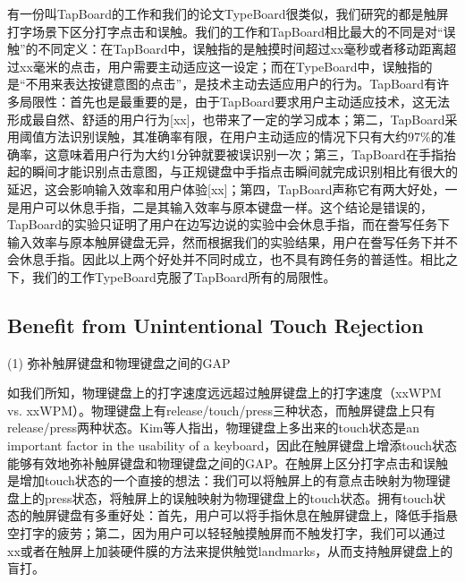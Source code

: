 有一份叫TapBoard的工作和我们的论文TypeBoard很类似\cite{2013-TapBoard}，我们研究的都是触屏打字场景下区分打字点击和误触。我们的工作和TapBoard相比最大的不同是对“误触”的不同定义：在TapBoard中，误触指的是触摸时间超过xx毫秒或者移动距离超过xx毫米的点击，用户需要主动适应这一设定；而在TypeBoard中，误触指的是“不用来表达按键意图的点击”，是技术主动去适应用户的行为。TapBoard有许多局限性：首先也是最重要的是，由于TapBoard要求用户主动适应技术，这无法形成最自然、舒适的用户行为[xx]，也带来了一定的学习成本；第二，TapBoard采用阈值方法识别误触，其准确率有限，在用户主动适应的情况下只有大约97\%的准确率，这意味着用户行为大约1分钟就要被误识别一次；第三，TapBoard在手指抬起的瞬间才能识别点击意图，与正规键盘中手指点击瞬间就完成识别相比有很大的延迟，这会影响输入效率和用户体验[xx]；第四，TapBoard声称它有两大好处，一是用户可以休息手指，二是其输入效率与原本键盘一样。这个结论是错误的，TapBoard的实验只证明了用户在边写边说的实验中会休息手指，而在誊写任务下输入效率与原本触屏键盘无异，然而根据我们的实验结果，用户在誊写任务下并不会休息手指。因此以上两个好处并不同时成立，也不具有跨任务的普适性。相比之下，我们的工作TypeBoard克服了TapBoard所有的局限性。


\subsection{Benefit from Unintentional Touch Rejection}

(1) 弥补触屏键盘和物理键盘之间的GAP

如我们所知，物理键盘上的打字速度远远超过触屏键盘上的打字速度（xxWPM vs. xxWPM）。物理键盘上有release/touch/press三种状态，而触屏键盘上只有release/press两种状态。Kim等人\cite{2013-TapBoard}指出，物理键盘上多出来的touch状态是an important factor in the usability of a keyboard，因此在触屏键盘上增添touch状态能够有效地弥补触屏键盘和物理键盘之间的GAP。在触屏上区分打字点击和误触是增加touch状态的一个直接的想法：我们可以将触屏上的有意点击映射为物理键盘上的press状态，将触屏上的误触映射为物理键盘上的touch状态\cite{2013-TapBoard,2016-TapBoard2}。拥有touch状态的触屏键盘有多重好处：首先，用户可以将手指休息在触屏键盘上，降低手指悬空打字的疲劳\cite{2013-TouchDisplay}；第二，因为用户可以轻轻触摸触屏而不触发打字，我们可以通过xx\cite{2011-Stimtac,2010-TeslaTouch,2011-Enhancing}或者在触屏上加装硬件膜\cite{2008-Slap,2020-TouchFire}的方法来提供触觉landmarks，从而支持触屏键盘上的盲打。

